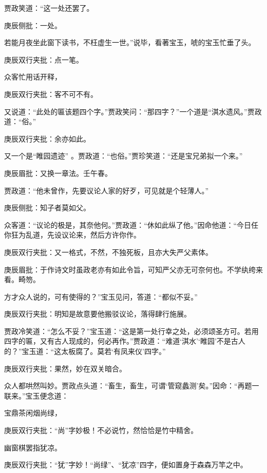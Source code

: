 \begin{parag}
    贾政笑道：“这一处还罢了。\begin{note}庚辰侧批：一处。\end{note}若能月夜坐此窗下读书，不枉虚生一世。”说毕，看著宝玉，唬的宝玉忙垂了头。\begin{note}庚辰双行夹批：点一笔。\end{note}众客忙用话开释，\begin{note}庚辰双行夹批：客不可不有。\end{note}又说道：“此处的匾该题四个字。”贾政笑问：“那四字？”一个道是“淇水遗风。”贾政道：“俗。”\begin{note}庚辰双行夹批：余亦如此。\end{note}又一个是“睢园遗迹” 。贾政道：“也俗。”贾珍笑道：“还是宝兄弟拟一个来。”\begin{note}庚辰眉批：又换一章法。壬午春。\end{note}贾政道：“他未曾作，先要议论人家的好歹，可见就是个轻薄人。”\begin{note}庚辰侧批：知子者莫如父。\end{note}众客道：“议论的极是，其奈他何。”贾政道：“休如此纵了他。”因命他道：“今日任你狂为乱道，先设议论来，然后方许你作。\begin{note}庚辰双行夹批：又一格式，不然，不独死板，且亦大失严父素体。\end{note}\begin{note}庚辰眉批：于作诗文时虽政老亦有如此令旨，可知严父亦无可奈何也。不学纨绔来看。畸笏。\end{note}方才众人说的，可有使得的？”宝玉见问，答道：“都似不妥。”\begin{note}庚辰双行夹批：明知是故意要他搬驳议论，落得肆行施展。\end{note}贾政冷笑道：“怎么不妥？”宝玉道：“这是第一处行幸之处，必须颂圣方可。若用四字的匾，又有古人现成的，何必再作。”贾政道：“难道‘淇水’‘睢园’不是古人的？”宝玉道：“这太板腐了。莫若‘有凤来仪’四字。”\begin{note}庚辰双行夹批：果然，妙在双关暗合。\end{note}众人都哄然叫妙。贾政点头道：“畜生，畜生，可谓‘管窥蠡测’矣。”因命：“再题一联来。”宝玉便念道：
\end{parag}


\begin{poem}
    \begin{pl}宝鼎茶闲烟尚绿，\end{pl}
    \begin{note}庚辰双行夹批：“尚”字妙极！不必说竹，然恰恰是竹中精舍。\end{note}
    \begin{pl}幽窗棋罢指犹凉。\end{pl}
    \begin{note}庚辰双行夹批：“犹”字妙！“尚绿”、“犹凉”四字，便如置身于森森万竿之中。\end{note}
\end{poem}


